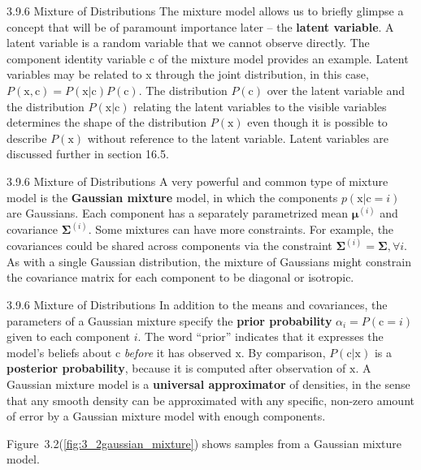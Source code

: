\begin{frame}{3.9.6 Mixture of Distributions}
    \justifying
    The mixture model allows us to briefly glimpse a concept that will be of paramount importance later -- the \textbf{latent variable}. A latent variable is a random variable that we cannot observe directly. The component identity variable c of the mixture model provides an example. Latent variables may be related to x through the joint distribution, in this case, $P(\mathrm{x}, \mathrm{c}) = P(\mathrm{x} | \mathrm{c})P(\mathrm{c})$. The distribution $P(\mathrm{c})$ over the latent variable and the distribution $P(\mathrm{x} | \mathrm{c})$ relating the latent variables to the visible variables determines the shape of the distribution $P(\mathrm{x})$ even though it is possible to describe $P(\mathrm{x})$ without reference to the latent variable. Latent variables are discussed further in section 16.5.
\end{frame}

\begin{frame}{3.9.6 Mixture of Distributions}
    \justifying
    A very powerful and common type of mixture model is the \textbf{Gaussian mixture} model, in which the components $p(\boldsymbol{\mathrm{x}} | \mathrm{c} = i)$ are Gaussians. Each component has a separately parametrized mean $\boldsymbol{\mu}^{(i)}$ and covariance $\boldsymbol{\Sigma}^{(i)}$. Some mixtures can have more constraints. For example, the covariances could be shared across components via the constraint $\boldsymbol{\Sigma}^{(i)} = \boldsymbol{\Sigma}, \forall i$. As with a single Gaussian distribution, the mixture of Gaussians might constrain the covariance matrix for each component to be diagonal or isotropic.
\end{frame}

\begin{frame}{3.9.6 Mixture of Distributions}
    \justifying
    In addition to the means and covariances, the parameters of a Gaussian mixture specify the \textbf{prior probability} $\alpha_{i} = P(\mathrm{c} = i)$ given to each component $i$. The word ``prior'' indicates that it expresses the model’s beliefs about $\mathrm{c}$ \textit{before} it has observed $\boldsymbol{\mathrm{x}}$. By comparison, $P(\mathrm{c} | \boldsymbol{\mathrm{x}})$ is a \textbf{posterior probability}, because it is computed after observation of $\boldsymbol{\mathrm{x}}$. A Gaussian mixture model is a \textbf{universal approximator} of densities, in the sense that any smooth density can be approximated with any specific, non-zero amount of error by a Gaussian mixture model with enough components.
    
    Figure~3.2(\ref{fig:3_2gaussian_mixture}) shows samples from a Gaussian mixture model.
\end{frame}

